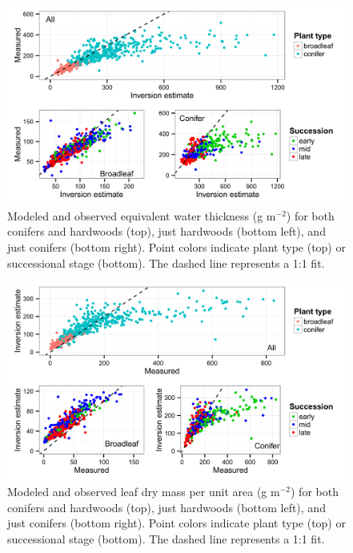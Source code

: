 \begin{figure}
  \centering
  \includegraphics[width=\textwidth]{2_rtm_inversion/figures/ewt_validation.pdf}
  \caption{%
    Modeled and observed equivalent water thickness (g m$^{-2}$) for both conifers and hardwoods (top), just hardwoods (bottom left), and just conifers (bottom right).
    Point colors indicate plant type (top) or successional stage (bottom).
    The dashed line represents a 1:1 fit.
  }\label{fig:pecanrtm-ewt}
\end{figure}

\begin{figure}
  \centering
  \includegraphics[width=\textwidth]{2_rtm_inversion/figures/lma_validation.pdf}
  \caption{%
    Modeled and observed leaf dry mass per unit area (g m$^{-2}$) for both conifers and hardwoods (top), just hardwoods (bottom left), and just conifers (bottom right).
    Point colors indicate plant type (top) or successional stage (bottom).
    The dashed line represents a 1:1 fit.
  }\label{fig:pecanrtm-lma}
\end{figure}


